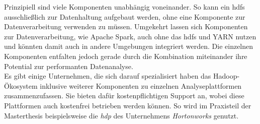 \noindent
Prinzipiell sind viele Komponenten unabhängig voneinander. So kann ein \gls{hdfs} ausschließlich zur Datenhaltung aufgebaut werden, ohne eine Komponente zur Datenverarbeitung verwenden zu müssen. Umgekehrt lassen sich Komponenten zur Datenverarbeitung, wie Apache Spark, auch ohne das \gls{hdfs} und YARN nutzen und könnten damit auch in andere Umgebungen integriert werden. Die einzelnen Komponenten entfalten jedoch gerade durch die Kombination miteinander ihre Potential zur performanten Datenanalyse.\\

\noindent
Es gibt einige Unternehmen, die sich darauf spezialisiert haben das Hadoop-Ökosystem inklusive weiterer Komponenten zu einzelnen Analyseplattformen zusammenzufassen. Sie bieten dafür kostenpflichtigen Support an, wobei diese Plattformen auch kostenfrei betrieben werden können. So wird im Praxisteil der Masterthesis beispielsweise die \textit{\gls{hdp}} des Unternehmens \textit{Hortonworks} genutzt.


